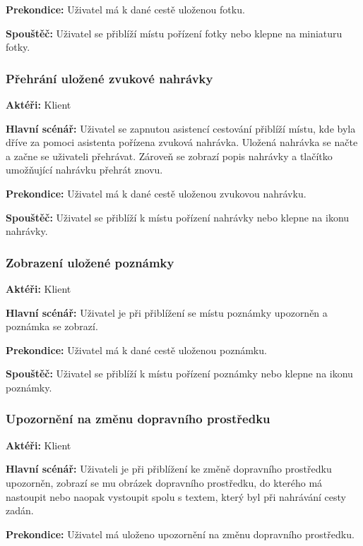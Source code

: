 \documentclass[czech,master,public,dept460,male,java,cpdeclaration]{diploma}
\newcommand{\usecase}[2]{\subsubsection{#1}\label{#2}}
\begin{document}
\vspace{0.1cm}
\noindent
\textbf{Prekondice:} Uživatel má k dané cestě uloženou fotku.

\vspace{0.1cm}
\noindent
\textbf{Spouštěč:} Uživatel se přiblíží místu pořízení fotky nebo klepne na miniaturu fotky.


\usecase{Přehrání uložené zvukové nahrávky}{prehraninahravky}
\textbf{Aktéři:} Klient

\vspace{0.1cm}
\noindent
\textbf{Hlavní scénář:} Uživatel se zapnutou asistencí cestování přiblíží místu,
kde byla dříve za pomoci asistenta pořízena zvuková nahrávka. Uložená nahrávka se načte
a začne se uživateli přehrávat. Zároveň se zobrazí popis nahrávky a tlačítko umožňující
nahrávku přehrát znovu.

\vspace{0.1cm}
\noindent
\textbf{Prekondice:} Uživatel má k dané cestě uloženou zvukovou nahrávku.

\vspace{0.1cm}
\noindent
\textbf{Spouštěč:} Uživatel se přiblíží k místu pořízení nahrávky nebo klepne na ikonu nahrávky.

\usecase{Zobrazení uložené poznámky}{zobrazenipoznamky}
\textbf{Aktéři:} Klient

\vspace{0.1cm}
\noindent
\textbf{Hlavní scénář:} Uživatel je při přiblížení se místu poznámky upozorněn a poznámka se zobrazí.

\vspace{0.1cm}
\noindent
\textbf{Prekondice:} Uživatel má k dané cestě uloženou poznámku.

\vspace{0.1cm}
\noindent
\textbf{Spouštěč:} Uživatel se přiblíží k místu pořízení poznámky nebo klepne na ikonu poznámky.

\usecase{Upozornění na změnu dopravního prostředku}{upozorneniprostredek}
\textbf{Aktéři:} Klient

\vspace{0.1cm}
\noindent
\textbf{Hlavní scénář:} Uživateli je při přiblížení ke změně dopravního prostředku upozorněn,
zobrazí se mu obrázek dopravního prostředku, do kterého má nastoupit nebo naopak vystoupit spolu
s textem, který byl při nahrávání cesty zadán.

\vspace{0.1cm}
\noindent
\textbf{Prekondice:} Uživatel má uloženo upozornění na změnu dopravního prostředku.
\end{document}
